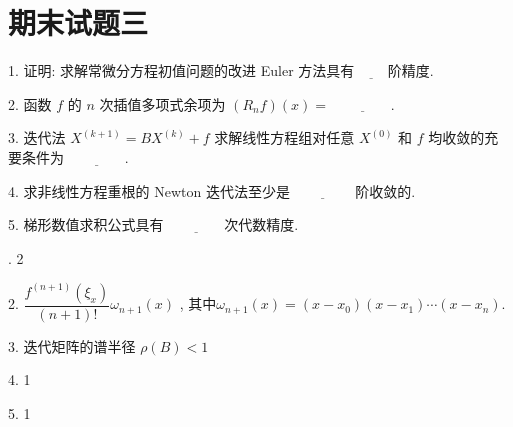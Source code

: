 \newpage
\section{期末试题三}
\begin{tcolorbox}[breakable,
		colframe=white!10!jingga, coltitle=white!90!jingga, colback=white!95!jingga, coltext=black, colbacktitle=white!10!jingga, enhanced, fonttitle=\bfseries,fontupper=\normalsize, attach boxed title to top left={yshift=-2mm}, before skip=8pt, after skip=8pt,
		title=填空题]
 

1. 证明: 求解常微分方程初值问题的改进 Euler 方法具有$\underline{\hspace{1cm}}$阶精度.

2. 函数 $ f $ 的 $ n $ 次插值多项式余项为 $ \left(R_{n} f\right)(x)= $ $\underline{\hspace{4em}}$.

3. 迭代法 $ X^{(k+1)}=B X^{(k)}+f $ 求解线性方程组对任意 $ X^{(0)} $ 和 $ f $ 均收敛的充要条件为 $\underline{\hspace{4em}}$.

4. 求非线性方程重根的 Newton 迭代法至少是 $\underline{\hspace{4em}}$ 阶收敛的.

5. 梯形数值求积公式具有 $\underline{\hspace{4em}}$次代数精度.


 . 2
 
2. $ \dfrac{f^{(n+1)}\left(\xi_{x}\right)}{(n+1)!} \omega_{n+1}(x)$ , 其中$ \omega_{n+1}(x)=\left(x-x_{0}\right)\left(x-x_{1}\right) \cdots\left(x-x_{n}\right)$.

3. 迭代矩阵的谱半径 $\rho (B)<1$

4. 1

5. 1
\end{tcolorbox}


